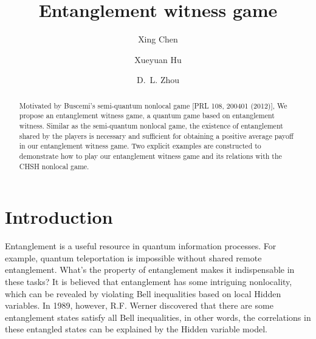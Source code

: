 \documentclass[twocolumn,pra,showpacs,superscriptaddress]{revtex4-1}
\begin{document}

\title{Entanglement witness game}

\author{Xing Chen}



\author{Xueyuan Hu}


\author{D.~L. Zhou}






\begin{abstract}
  Motivated by Buscemi's semi-quantum nonlocal game [PRL 108, 200401
  (2012)], We propose an entanglement witness game, a quantum game
  based on entanglement witness. Similar as the
  semi-quantum nonlocal game, the existence of entanglement shared by
  the players is necessary and sufficient for obtaining a positive
  average payoff in our entanglement witness game. Two explicit examples are
  constructed to demonstrate how to play our entanglement witness game and its
  relations with the CHSH nonlocal game.
\end{abstract}


\maketitle


\section{Introduction}

Entanglement is a useful resource in quantum information processes.
For example, quantum teleportation is impossible without shared remote
entanglement. What's the property of entanglement makes it
indispensable in these tasks? It is believed that entanglement has
some intriguing nonlocality, which can be revealed by violating Bell
inequalities based on local Hidden variables. In 1989, however, R.F.
Werner \cite{wer} discovered that there are some entanglement states
satisfy all Bell inequalities, in other words, the
correlations\cite{bel}\cite{cla} in these entangled states can be
explained by the Hidden variable model.
\end{document}
